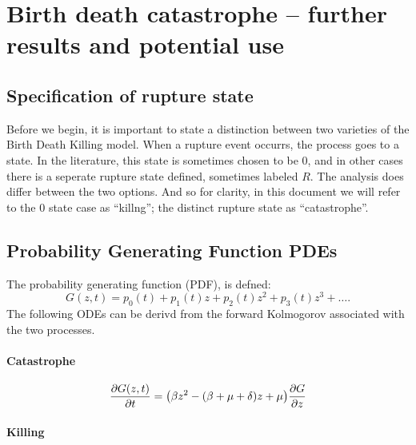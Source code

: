 



\chapter{Birth death catastrophe -- further results and potential use} 





















\section{Specification of rupture state}
Before we begin, it is important to state a distinction between two varieties of the Birth Death Killing model.
When a rupture event occurrs, the process goes to a state. In the literature, this state is sometimes chosen to be 0, and in other cases there is a seperate rupture state defined, sometimes labeled $R$. The analysis does differ between the two options. And so for clarity, in this document we will refer to the 0 state case as ``killng''; the distinct rupture state as ``catastrophe''.  

\section{Probability Generating Function PDEs}
The probability generating function (PDF),  is defned:
$$G(z,t) = p_0(t) + p_1(t)z + p_2(t)z^2 + p_3(t)z^3 + \dots.$$
The following ODEs can be derivd from the forward Kolmogorov associated with the two processes.

\subsubsection*{Catastrophe}

\begin{equation}
\label{catEq1}
\displaystyle\frac{\partial G(z,t)}{\partial t} = \big(\beta z^2 - (\beta + \mu + \delta)z + \mu\big)\displaystyle\frac{\partial G}{\partial z}
\end{equation}

\subsubsection*{Killing}

